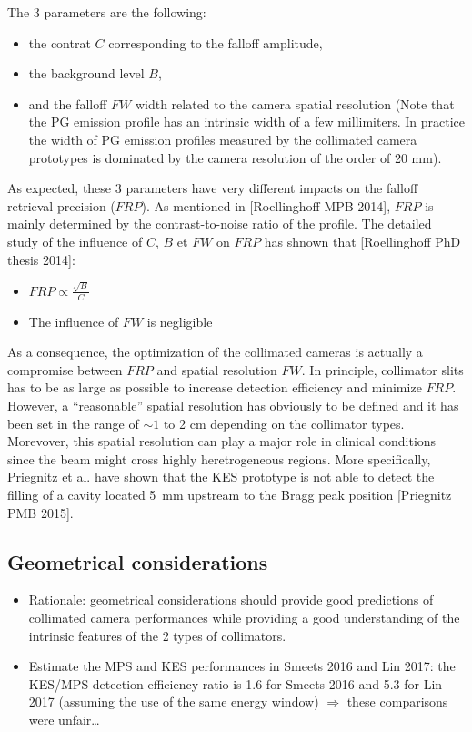 \documentclass[a4paper,english]{article}
\begin{document}
The 3 parameters are the following:
\begin{itemize}
  \item the contrat $C$ corresponding to the falloff amplitude,
  \item the background level $B$,
  \item and the falloff $FW$ width related to the camera spatial resolution (Note that the PG emission profile has an intrinsic width of a few millimiters. In practice the width of PG emission profiles measured by the collimated camera prototypes is dominated by the camera resolution of the order of 20 mm).
\end{itemize}

As expected, these 3 parameters have very different impacts on the falloff retrieval precision ($FRP$). As mentioned in [Roellinghoff MPB 2014], $FRP$ is mainly determined by the contrast-to-noise ratio of the profile. The detailed study of the influence of $C$, $B$ et $FW$ on $FRP$ has shnown that [Roellinghoff PhD thesis 2014]:
\begin{itemize}
 \item $FRP\propto \frac{\sqrt{B}}{C}$
 \item The influence of $FW$ is negligible
\end{itemize}

As a consequence, the optimization of the collimated cameras is actually a compromise between $FRP$ and spatial resolution $FW$. In principle, collimator slits has to be as large as possible to increase detection efficiency and minimize $FRP$. However, a \enquote{reasonable} spatial resolution has obviously to be defined and it has been set in the range of $\sim1$ to 2 cm depending on the collimator types. Morevover, this spatial resolution can play a major role in clinical conditions since the beam might cross highly heretrogeneous regions. More specifically, Priegnitz et al. have shown that the KES prototype is not able to detect the filling of a cavity located 5~mm upstream to the Bragg peak position [Priegnitz PMB 2015].


\subsection{Geometrical considerations}



\begin{itemize}
  \item Rationale: geometrical considerations should provide good predictions of collimated camera performances while providing a good understanding of the intrinsic features of the 2 types of collimators. 
  \item Estimate the MPS and KES performances in Smeets 2016 and Lin 2017: the KES/MPS detection efficiency ratio is 1.6 for Smeets 2016 and 5.3 for Lin 2017 (assuming the use of the same energy window) $\Rightarrow$ these comparisons were unfair\dots    
\end{itemize}
\end{document}
